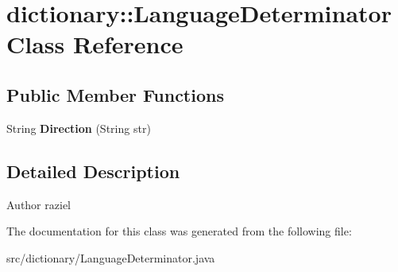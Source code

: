 \hypertarget{classdictionary_1_1_language_determinator}{
\section{dictionary::LanguageDeterminator Class Reference}
\label{classdictionary_1_1_language_determinator}
}
\subsection*{Public Member Functions}
\begin{DoxyCompactItemize}
\item 
\hypertarget{classdictionary_1_1_language_determinator_ae7fa0331d1cb32d15cf97b6873d34bc0}{
String {\bfseries Direction} (String str)}
\label{classdictionary_1_1_language_determinator_ae7fa0331d1cb32d15cf97b6873d34bc0}

\end{DoxyCompactItemize}


\subsection{Detailed Description}
\begin{DoxyAuthor}{Author}
raziel 
\end{DoxyAuthor}


The documentation for this class was generated from the following file:\begin{DoxyCompactItemize}
\item 
src/dictionary/LanguageDeterminator.java\end{DoxyCompactItemize}
